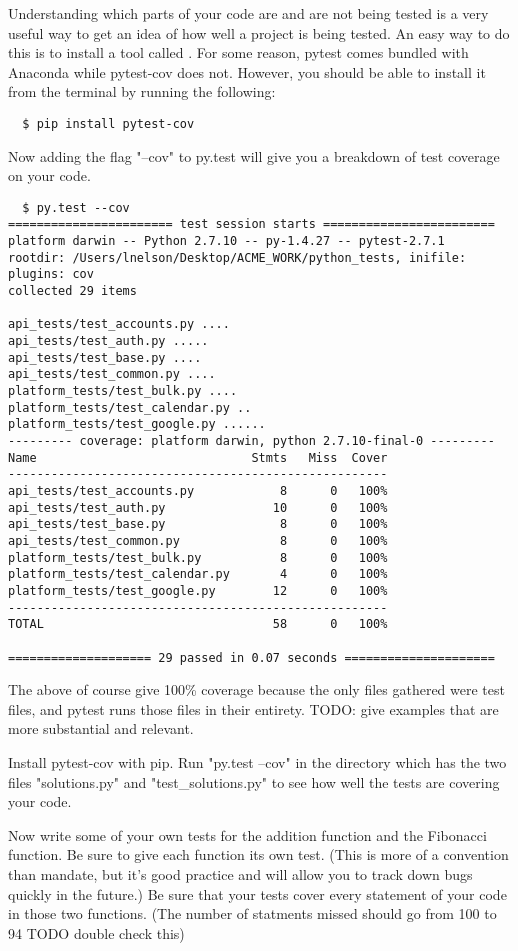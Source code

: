 Understanding which parts of your code are and are not being tested is a very useful way to get an idea of how well a project is being tested.
An easy way to do this is to install a tool called . For some reason, pytest comes bundled with Anaconda while pytest-cov does not.  However, you should be able to install it from the terminal by running the following:
\begin{lstlisting}
  $ pip install pytest-cov
\end{lstlisting}
Now adding the flag "--cov" to py.test will give you a breakdown of test coverage on your code.
\begin{lstlisting}
  $ py.test --cov
======================= test session starts ========================
platform darwin -- Python 2.7.10 -- py-1.4.27 -- pytest-2.7.1
rootdir: /Users/lnelson/Desktop/ACME_WORK/python_tests, inifile:
plugins: cov
collected 29 items

api_tests/test_accounts.py ....
api_tests/test_auth.py .....
api_tests/test_base.py ....
api_tests/test_common.py ....
platform_tests/test_bulk.py ....
platform_tests/test_calendar.py ..
platform_tests/test_google.py ......
--------- coverage: platform darwin, python 2.7.10-final-0 ---------
Name                              Stmts   Miss  Cover
-----------------------------------------------------
api_tests/test_accounts.py            8      0   100%
api_tests/test_auth.py               10      0   100%
api_tests/test_base.py                8      0   100%
api_tests/test_common.py              8      0   100%
platform_tests/test_bulk.py           8      0   100%
platform_tests/test_calendar.py       4      0   100%
platform_tests/test_google.py        12      0   100%
-----------------------------------------------------
TOTAL                                58      0   100%

==================== 29 passed in 0.07 seconds =====================
\end{lstlisting}

The above of course give 100\% coverage because the only files gathered were test files, and pytest runs those files in their entirety.  TODO: give examples that are more substantial and relevant.

\begin{problem}
Install pytest-cov with pip.
Run "py.test --cov" in the directory which has the two files "solutions.py" and "test\_solutions.py" to see how well the tests are covering your code.

Now write some of your own tests for the addition function and the Fibonacci function. Be sure to give each function its own test. (This is more of a convention than mandate,
but it's good practice and will allow you to track down bugs quickly in the future.) Be sure that your tests cover every statement of your code in those two functions.
(The number of statments missed should go from 100 to 94 TODO double check this)
\end{problem}

